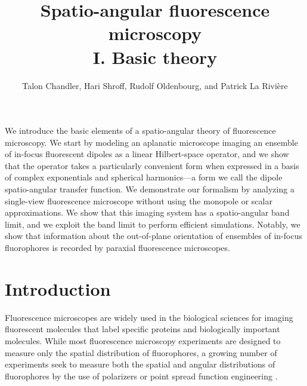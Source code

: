 \documentclass[]{osa-article}
\begin{document}
\title{Spatio-angular fluorescence microscopy\\ I. Basic theory}

\author{Talon Chandler, Hari Shroff, Rudolf Oldenbourg, and Patrick La Rivi\`ere}

\address{University of Chicago, Department of Radiology, Chicago, Illinois 60637, USA\\
  Section on High Resolution Optical Imaging, National Institute
  of Biomedical Imaging and Bioengineering, National Institutes of Health,
  Bethesda, Maryland 20892, USA\\
  Marine Biological Laboratory, Bell Center, Woods Hole, Massachusetts 02543, USA
}




\begin{abstract*}
  We introduce the basic elements of a spatio-angular theory of fluorescence
  microscopy. We start by modeling an aplanatic microscope imaging an ensemble
  of in-focus fluorescent dipoles as a linear Hilbert-space operator, and we
  show that the operator takes a particularly convenient form when expressed in
  a basis of complex exponentials and spherical harmonics---a form we call the
  dipole spatio-angular transfer function. We demonstrate our formalism by
  analyzing a single-view fluorescence microscope without using the monopole or
  scalar approximations. We show that this imaging system has a spatio-angular
  band limit, and we exploit the band limit to perform efficient simulations.
  Notably, we show that information about the out-of-plane orientation of
  ensembles of in-focus fluorophores is recorded by paraxial fluorescence
  microscopes.
\end{abstract*}

\section{Introduction}
Fluorescence microscopes are widely used in the biological sciences for imaging
fluorescent molecules that label specific proteins and biologically important
molecules. While most fluorescence microscopy experiments are designed to
measure only the spatial distribution of fluorophores, a growing number of
experiments seek to measure both the spatial and angular distributions of
fluorophores by the use of polarizers \cite{vrabioiu2006, mattheyses2010,
  mehta2016, mcquilken2017, zhanghao2017} or point spread function engineering
\cite{agrawal2012, zhang2018}.
\end{document}
